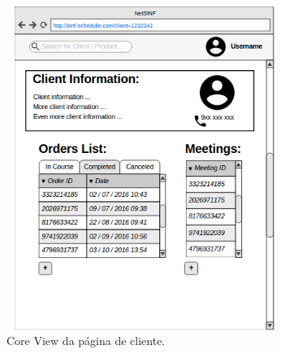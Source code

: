 \begin{titlepage}
\begin{figure}[H]
  \centering
    \includegraphics[width=9cm, height = 10.5cm]{SINF_clientpage.png}
  \caption{Core View da página de cliente.}
  \label{uml}
\end{figure}


\end{titlepage}
